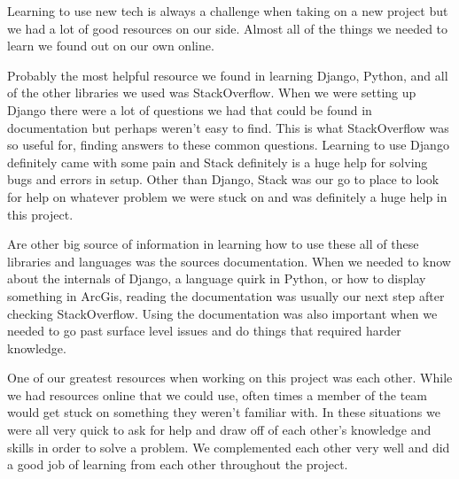 Learning to use new tech is always a challenge when taking on a new project but we had a lot of good resources on our side.
Almost all of the things we needed to learn we found out on our own online.

Probably the most helpful resource we found in learning Django, Python, and all of the other libraries we used was StackOverflow.
When we were setting up Django there were a lot of questions we had that could be found in documentation but perhaps weren't easy to find.
This is what StackOverflow was so useful for, finding answers to these common questions.
Learning to use Django definitely came with some pain and Stack definitely is a huge help for solving bugs and errors in setup.
Other than Django, Stack was our go to place to look for help on whatever problem we were stuck on and was definitely a huge help in this project.

Are other big source of information in learning how to use these all of these libraries and languages was the sources documentation.
When we needed to know about the internals of Django, a language quirk in Python, or how to display something in ArcGis, reading the documentation was usually our next step after checking StackOverflow.
Using the documentation was also important when we needed to go past surface level issues and do things that required harder knowledge.

One of our greatest resources when working on this project was each other.
While we had resources online that we could use, often times a member of the team would get stuck on something they weren't familiar with.
In these situations we were all very quick to ask for help and draw off of each other's knowledge and skills in order to solve a problem.
We complemented each other very well and did a good job of learning from each other throughout the project.
